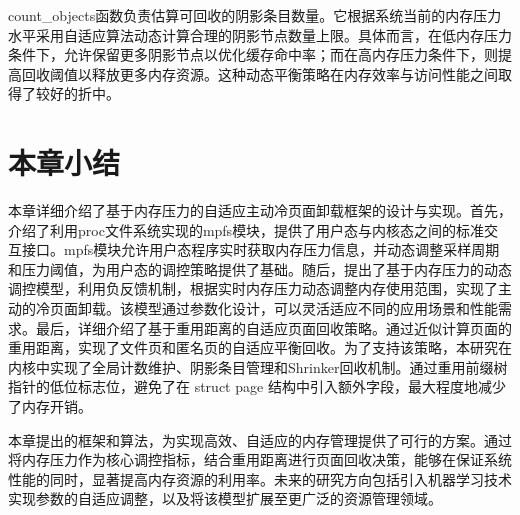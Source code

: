 count\_objects函数负责估算可回收的阴影条目数量。它根据系统当前的内存压力水平采用自适应算法动态计算合理的阴影节点数量上限。具体而言，在低内存压力条件下，允许保留更多阴影节点以优化缓存命中率；而在高内存压力条件下，则提高回收阈值以释放更多内存资源。这种动态平衡策略在内存效率与访问性能之间取得了较好的折中。

\section{本章小结}
\label{sec:本章小结}

本章详细介绍了基于内存压力的自适应主动冷页面卸载框架的设计与实现。首先，介绍了利用proc文件系统实现的mpfs模块，提供了用户态与内核态之间的标准交互接口。mpfs模块允许用户态程序实时获取内存压力信息，并动态调整采样周期和压力阈值，为用户态的调控策略提供了基础。随后，提出了基于内存压力的动态调控模型，利用负反馈机制，根据实时内存压力动态调整内存使用范围，实现了主动的冷页面卸载。该模型通过参数化设计，可以灵活适应不同的应用场景和性能需求。最后，详细介绍了基于重用距离的自适应页面回收策略。通过近似计算页面的重用距离，实现了文件页和匿名页的自适应平衡回收。为了支持该策略，本研究在内核中实现了全局计数维护、阴影条目管理和Shrinker回收机制。通过重用前缀树指针的低位标志位，避免了在 struct page 结构中引入额外字段，最大程度地减少了内存开销。

本章提出的框架和算法，为实现高效、自适应的内存管理提供了可行的方案。通过将内存压力作为核心调控指标，结合重用距离进行页面回收决策，能够在保证系统性能的同时，显著提高内存资源的利用率。未来的研究方向包括引入机器学习技术实现参数的自适应调整，以及将该模型扩展至更广泛的资源管理领域。
